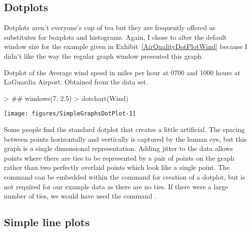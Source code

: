 \subsection{Dotplots} 
 
Dotplots aren't everyone's cup of tea but they are frequently offered as substitutes for boxplots and histograms. Again, I chose to alter the default window size for the example given in Exhibit~\ref{AirQualityDotPlotWind} 
because I didn't like the way the regular graph window presented this graph. 
\begin{exhibit} 
\begin{center} 
\caption{Dotplot of the Average wind speed in miles per hour at 0700 and 1000 hours at LaGuardia Airport. Obtained from the  data set.} 
\label{AirQualityDotPlotWind} 

\begin{Schunk}
\begin{Sinput}
> ## windows(7, 2.5)
> dotchart(Wind)
\end{Sinput}

\texttt{[image: figures/SimpleGraphsDotPlot-1]} \end{Schunk}

\end{center} 
\end{exhibit} 
 
Some people find the standard dotplot that \R{} creates a little artificial. The spacing between points horizontally and vertically is captured by the human eye, but this graph is a single dimensional representation. Adding jitter to the data allows points where there are ties to be represented by a pair of points on the graph rather than two perfectly overlaid points which look like a single point. The  command can be embedded within the command for creation of a dotplot, but is not required for our example data as there are no ties. If there were a large number of ties, we would have used the command . 
 
 
 
\subsection{Simple line plots} 
 
